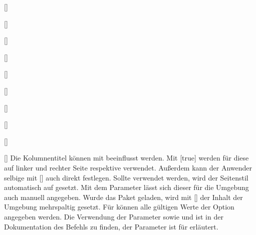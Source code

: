 \begin{Declaration*}{}
\begin{Declaration*}{}
\begin{Declaration*}{}
\begin{Declaration}[v2.02]{[]}
\begin{Declaration}[v2.04]{%
}
\begin{Declaration}{[]}
\begin{Declaration}[v2.02]{%
  []%
}
\begin{Declaration}[v2.02]{%
  []%
}
\begin{Declaration}[v2.02]{%
  []%
}
\begin{Declaration}{[\PSet]}
\begin{Declaration}{%
  []
}
\begin{Declaration}{[]}
\begin{Declaration}{[]}
\begin{Declaration}{[]}
Die Kolumnentitel können mit  
beeinflusst werden. Mit [true] werden 
für diese auf linker und rechter Seite  respektive 
 verwendet. Außerdem kann der Anwender selbige mit 
[] auch direkt 
festlegen. Sollte  verwendet werden, 
wird der Seitenstil automatisch auf  gesetzt. Mit dem 
Parameter  lässt sich dieser für die 
Umgebung auch manuell angegeben. Wurde das Paket  geladen, 
wird mit [] der Inhalt 
der Umgebung mehrspaltig gesetzt. Für  
können alle gültigen Werte der Option  angegeben werden. 
Die Verwendung der Parameter  sowie
 und  ist 
in der Dokumentation des Befehls  zu finden, der Parameter 
 ist für  erläutert.
\end{Declaration}
\end{Declaration}
\end{Declaration}
\end{Declaration}
\end{Declaration}
\end{Declaration}
\end{Declaration}
\end{Declaration}
\end{Declaration}
\end{Declaration}
\end{Declaration}


\end{Declaration*}
\end{Declaration*}
\end{Declaration*}

